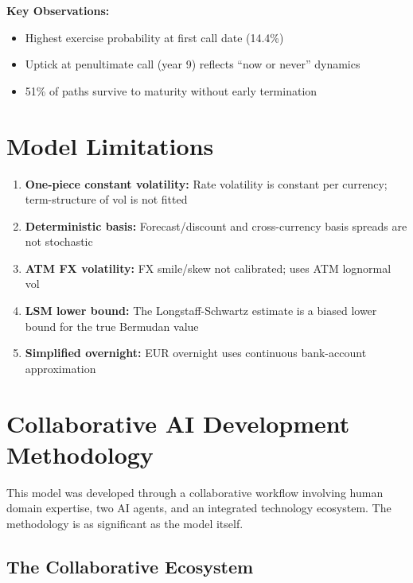 \documentclass[11pt,a4paper]{article}
\begin{document}
\textbf{Key Observations:}
\begin{itemize}
    \item Highest exercise probability at first call date (14.4\%)
    \item Uptick at penultimate call (year 9) reflects ``now or never'' dynamics
    \item 51\% of paths survive to maturity without early termination
\end{itemize}

\section{Model Limitations}

\begin{enumerate}
    \item \textbf{One-piece constant volatility:} Rate volatility is constant per currency; term-structure of vol is not fitted
    \item \textbf{Deterministic basis:} Forecast/discount and cross-currency basis spreads are not stochastic
    \item \textbf{ATM FX volatility:} FX smile/skew not calibrated; uses ATM lognormal vol
    \item \textbf{LSM lower bound:} The Longstaff-Schwartz estimate is a biased lower bound for the true Bermudan value
    \item \textbf{Simplified overnight:} EUR overnight uses continuous bank-account approximation
\end{enumerate}

\section{Collaborative AI Development Methodology}

This model was developed through a collaborative workflow involving human domain expertise, two AI agents, and an integrated technology ecosystem. The methodology is as significant as the model itself.

\subsection{The Collaborative Ecosystem}
\end{document}
